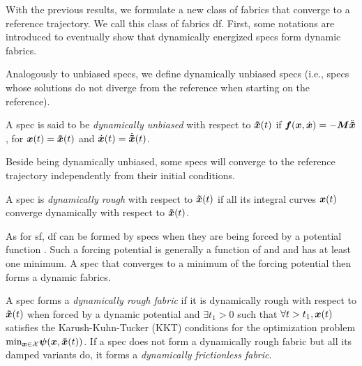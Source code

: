 With the previous results, we formulate a new class of fabrics that converge to a
reference trajectory. We call this class of fabrics \acl{df}. 
First, some notations are introduced to eventually show that dynamically energized specs
form dynamic fabrics.
%
\iffalse%
\begin{definition}
A spec is called \textit{dynamically converging} towards a reference $\xt(t)$,
if and only if
\[
  \exists t_1 \geq 0, \forall t \geq t_1:
      \xddot(t) = \xtddot(t), \xdot(t) = \xtdot(t), \x(t) = \xt(t),
\]
For clarity, we say that the spec is dynamically converging with respect to $\xt$, or
dynamically converging for short if the reference is clear from the context.
\end{definition}
\fi
%
Analogously to unbiased specs, we define dynamically unbiased specs (i.e., specs whose
solutions do not diverge from the reference \xt{} when starting on the reference).
\begin{definition}
A spec is said to be \textit{dynamically unbiased} with
respect to $\xt(t)$ if\newline
${\bm{f}(\bm{x}, \dot{\bm{x}}) = -\bm{M}\ddot{\bm{\tilde{x}}}}$, for $\bm{x}(t) = \bm{\tilde{x}}(t)$ and $\dot{\bm{x}}(t) = \dot{\bm{\tilde{x}}}(t)$.
\end{definition}

Beside being dynamically unbiased, some specs will converge to the reference trajectory
independently from their initial conditions.

\begin{definition}
A spec is \textit{dynamically rough} with respect to $\xt(t)$ if all
its integral curves $\bm{x}(t)$ converge dynamically with respect to $\xt(t)$.
\end{definition}

As for \ac{sf}, \ac{df} can be formed by
specs when they are being forced by a potential function \forc. Such a forcing potential is
generally a function of \x{} and \xt{} and has at least one minimum. A spec that converges
to a minimum of the forcing potential then forms a dynamic fabrics.

\begin{definition}
A spec forms a \textit{dynamically rough fabric} if it is dynamically rough with respect
to $\xt(t)$ when forced by a dynamic potential and 
$\exists t_1 > 0$ such that $\forall t>t_1, \bm{x}(t)$ satisfies the
Karush-Kuhn-Tucker (KKT) conditions for the optimization problem\newline
$\text{min}_{\bm{x}\in\mathcal{X}} \bm{\psi}(\bm{x},
\bm{\tilde{x}}(t))$. If a spec does not form a dynamically rough fabric but all its damped variants
do, it forms a \textit{dynamically frictionless fabric}.
\end{definition}

